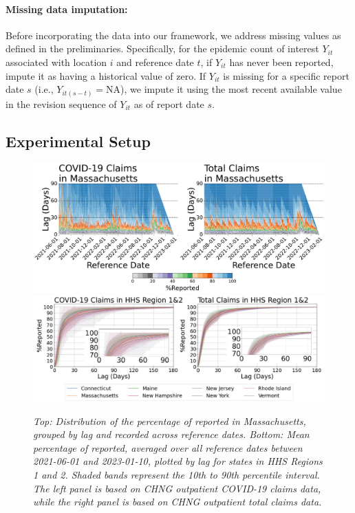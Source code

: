 \paragraph{Missing data imputation:}
Before incorporating the data into our framework, we address missing values as defined in the preliminaries. Specifically, for the epidemic count of interest $Y_{it}$ associated with location $i$ and reference date $t$, if $Y_{it}$ has never been reported, impute it as having a historical value of zero. If \( Y_{it} \) is missing for a specific report date \( s \) (i.e., \( Y_{it(s-t)} = \text{NA} \)), we impute it using the most recent available value in the revision sequence of \( Y_{it} \) as of report date \( s \).


\subsection{Experimental Setup}
\begin{figure}[h!]
    \centering
    \includegraphics[width=\textwidth]{figs/completeness_Massachusetts.pdf}
    \includegraphics[width=\textwidth]{figs/completeness_lineplot_hhs1&2.pdf}
    \caption{\emph{Top: Distribution of the percentage of reported in Massachusetts, grouped by lag and recorded across reference dates. Bottom: Mean percentage of reported, averaged over all reference dates between 2021-06-01 and 2023-01-10, plotted by lag for states in HHS Regions 1 and 2. Shaded bands represent the 10th to 90th percentile interval. The left panel is based on CHNG outpatient COVID-19 claims data, while the right panel is based on CHNG outpatient total claims data.}}
\end{figure}

